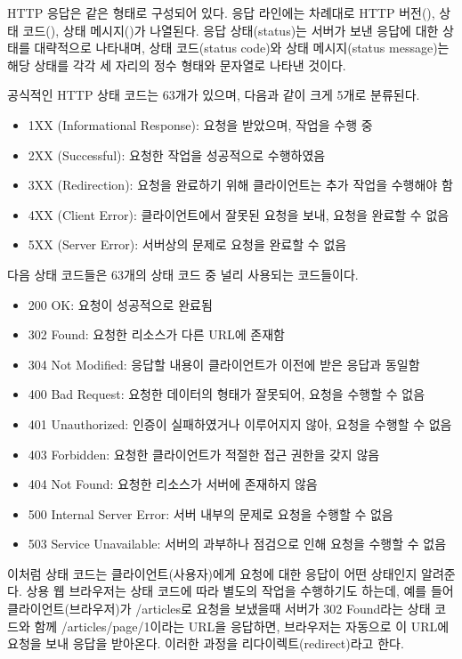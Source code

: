 HTTP 응답은 \과 같은 형태로 구성되어 있다. 응답 라인에는 차례대로 HTTP 버전(), 상태 코드(), 상태 메시지()가 나열된다. 응답 상태(status)는 서버가 보낸 응답에 대한 상태를 대략적으로 나타내며, 상태 코드(status code)와 상태 메시지(status message)는 해당 상태를 각각 세 자리의 정수 형태와 문자열로 나타낸 것이다.

공식적인 HTTP 상태 코드는 63개가 있으며, 다음과 같이 크게 5개로 분류된다.

\begin{itemize}
    \item 1XX (Informational Response): 요청을 받았으며, 작업을 수행 중
    \item 2XX (Successful): 요청한 작업을 성공적으로 수행하였음
    \item 3XX (Redirection): 요청을 완료하기 위해 클라이언트는 추가 작업을 수행해야 함
    \item 4XX (Client Error): 클라이언트에서 잘못된 요청을 보내, 요청을 완료할 수 없음
    \item 5XX (Server Error): 서버상의 문제로 요청을 완료할 수 없음
\end{itemize}

다음 상태 코드들은 63개의 상태 코드 중 널리 사용되는 코드들이다.

\begin{itemize}
    \item 200 OK: 요청이 성공적으로 완료됨
    \item 302 Found: 요청한 리소스가 다른 URL에 존재함
    \item 304 Not Modified: 응답할 내용이 클라이언트가 이전에 받은 응답과 동일함
    \item 400 Bad Request: 요청한 데이터의 형태가 잘못되어, 요청을 수행할 수 없음
    \item 401 Unauthorized: 인증이 실패하였거나 이루어지지 않아, 요청을 수행할 수 없음
    \item 403 Forbidden: 요청한 클라이언트가 적절한 접근 권한을 갖지 않음
    \item 404 Not Found: 요청한 리소스가 서버에 존재하지 않음
    \item 500 Internal Server Error: 서버 내부의 문제로 요청을 수행할 수 없음
    \item 503 Service Unavailable: 서버의 과부하나 점검으로 인해 요청을 수행할 수 없음
\end{itemize}

이처럼 상태 코드는 클라이언트(사용자)에게 요청에 대한 응답이 어떤 상태인지 알려준다. 상용 웹 브라우저는 상태 코드에 따라 별도의 작업을 수행하기도 하는데, 예를 들어 클라이언트(브라우저)가 /articles로 요청을 보냈을때 서버가 302 Found라는 상태 코드와 함께 /articles/page/1이라는 URL을 응답하면, 브라우저는 자동으로 이 URL에 요청을 보내 응답을 받아온다. 이러한 과정을 리다이렉트(redirect)라고 한다.

